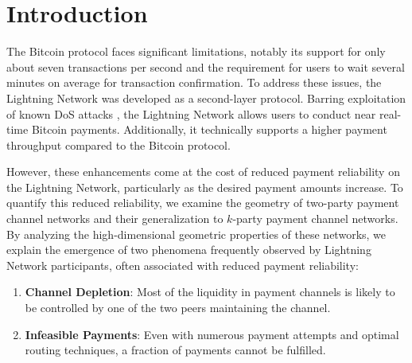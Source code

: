 \documentclass[10pt,twocolumn]{article}
\begin{document}

\section{Introduction}
The Bitcoin protocol faces significant limitations, notably its support for only about seven transactions per second and the requirement for users to wait several minutes on average for transaction confirmation. To address these issues, the Lightning Network was developed as a second-layer protocol. Barring exploitation of known DoS attacks \cite{harris2020flood,shikhelman2022unjamming,tochner2020route}, the Lightning Network allows users to conduct near real-time Bitcoin payments. Additionally, it technically supports a higher payment throughput compared to the Bitcoin protocol.

However, these enhancements come at the cost of reduced payment reliability on the Lightning Network, particularly as the desired payment amounts increase. To quantify this reduced reliability, we examine the geometry of two-party payment channel networks and their generalization to \( k \)-party payment channel networks. By analyzing the high-dimensional geometric properties of these networks, we explain the emergence of two phenomena frequently observed by Lightning Network participants, often associated with reduced payment reliability:

\begin{enumerate}
\item \textbf{Channel Depletion}: Most of the liquidity in payment channels is likely to be controlled by one of the two peers maintaining the channel.
\item \textbf{Infeasible Payments}: Even with numerous payment attempts and optimal routing techniques, a fraction of payments cannot be fulfilled.
\end{enumerate}
\end{document}
